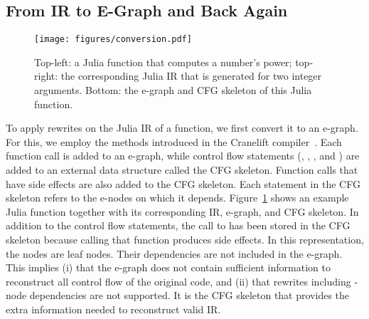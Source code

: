 \subsection{From IR to E-Graph and Back Again}
\label{sec:conversion}
\begin{figure}
    \centering
    \texttt{[image: figures/conversion.pdf]}
    \caption{Top-left: a Julia function that computes a number's power; top-right: the corresponding Julia IR that is generated  for two integer arguments.
    Bottom: the e-graph and CFG skeleton of this Julia function.}
    \label{fig:conversion}
\end{figure}
To apply rewrites on the Julia IR of a function, we first convert it to an e-graph.
For this, we employ the methods introduced in the Cranelift compiler~\cite{fallinAegraphsAcyclicEgraphs2023}.
Each function call is added to an e-graph, while control flow statements (, , , and ) are added to an external data structure called the CFG skeleton.
Function calls that have side effects are also added to the CFG skeleton.
Each statement in the CFG skeleton refers to the e-nodes on which it depends.
Figure~\ref{fig:conversion} shows an example Julia function  together with its corresponding IR, e-graph, and CFG skeleton.
In addition to the control flow statements, the call to  has been stored in the CFG skeleton because calling that function produces side effects.
In this representation, the  nodes are leaf nodes. Their dependencies are not included in the e-graph. This implies (i) that the e-graph does not contain sufficient information to reconstruct all control flow of the original code, and (ii) that rewrites including -node dependencies are not supported. It is the CFG skeleton that provides the extra information needed to reconstruct valid IR. 

